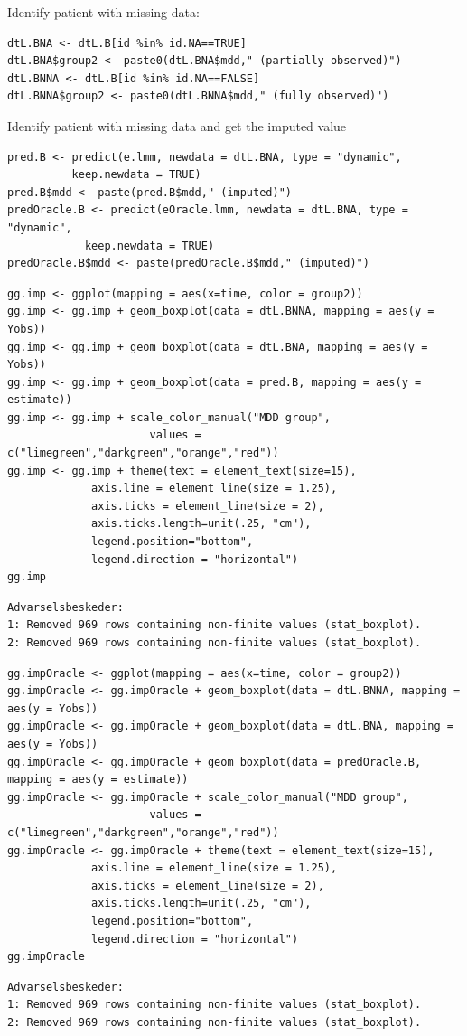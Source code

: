 \documentclass[12pt]{article}
\begin{document}
Identify patient with missing data:
\lstset{language=r,label= ,caption= ,captionpos=b,numbers=none}
\begin{lstlisting}
dtL.BNA <- dtL.B[id %in% id.NA==TRUE]
dtL.BNA$group2 <- paste0(dtL.BNA$mdd," (partially observed)")
dtL.BNNA <- dtL.B[id %in% id.NA==FALSE]
dtL.BNNA$group2 <- paste0(dtL.BNNA$mdd," (fully observed)")
\end{lstlisting}

Identify patient with missing data and get the imputed value
\lstset{language=r,label= ,caption= ,captionpos=b,numbers=none}
\begin{lstlisting}
pred.B <- predict(e.lmm, newdata = dtL.BNA, type = "dynamic",
		  keep.newdata = TRUE)
pred.B$mdd <- paste(pred.B$mdd," (imputed)")
predOracle.B <- predict(eOracle.lmm, newdata = dtL.BNA, type = "dynamic",
			keep.newdata = TRUE)
predOracle.B$mdd <- paste(predOracle.B$mdd," (imputed)")
\end{lstlisting}

\lstset{language=r,label= ,caption= ,captionpos=b,numbers=none}
\begin{lstlisting}
gg.imp <- ggplot(mapping = aes(x=time, color = group2))
gg.imp <- gg.imp + geom_boxplot(data = dtL.BNNA, mapping = aes(y = Yobs))
gg.imp <- gg.imp + geom_boxplot(data = dtL.BNA, mapping = aes(y = Yobs))
gg.imp <- gg.imp + geom_boxplot(data = pred.B, mapping = aes(y = estimate))
gg.imp <- gg.imp + scale_color_manual("MDD group",
				      values = c("limegreen","darkgreen","orange","red"))
gg.imp <- gg.imp + theme(text = element_text(size=15),
			 axis.line = element_line(size = 1.25),
			 axis.ticks = element_line(size = 2),
			 axis.ticks.length=unit(.25, "cm"),
			 legend.position="bottom",
			 legend.direction = "horizontal")
gg.imp
\end{lstlisting}

\begin{verbatim}
Advarselsbeskeder:
1: Removed 969 rows containing non-finite values (stat_boxplot). 
2: Removed 969 rows containing non-finite values (stat_boxplot).
\end{verbatim}


\lstset{language=r,label= ,caption= ,captionpos=b,numbers=none}
\begin{lstlisting}
gg.impOracle <- ggplot(mapping = aes(x=time, color = group2))
gg.impOracle <- gg.impOracle + geom_boxplot(data = dtL.BNNA, mapping = aes(y = Yobs))
gg.impOracle <- gg.impOracle + geom_boxplot(data = dtL.BNA, mapping = aes(y = Yobs))
gg.impOracle <- gg.impOracle + geom_boxplot(data = predOracle.B, mapping = aes(y = estimate))
gg.impOracle <- gg.impOracle + scale_color_manual("MDD group",
				      values = c("limegreen","darkgreen","orange","red"))
gg.impOracle <- gg.impOracle + theme(text = element_text(size=15),
			 axis.line = element_line(size = 1.25),
			 axis.ticks = element_line(size = 2),
			 axis.ticks.length=unit(.25, "cm"),
			 legend.position="bottom",
			 legend.direction = "horizontal")
gg.impOracle
\end{lstlisting}

\begin{verbatim}
Advarselsbeskeder:
1: Removed 969 rows containing non-finite values (stat_boxplot). 
2: Removed 969 rows containing non-finite values (stat_boxplot).
\end{verbatim}
\end{document}
